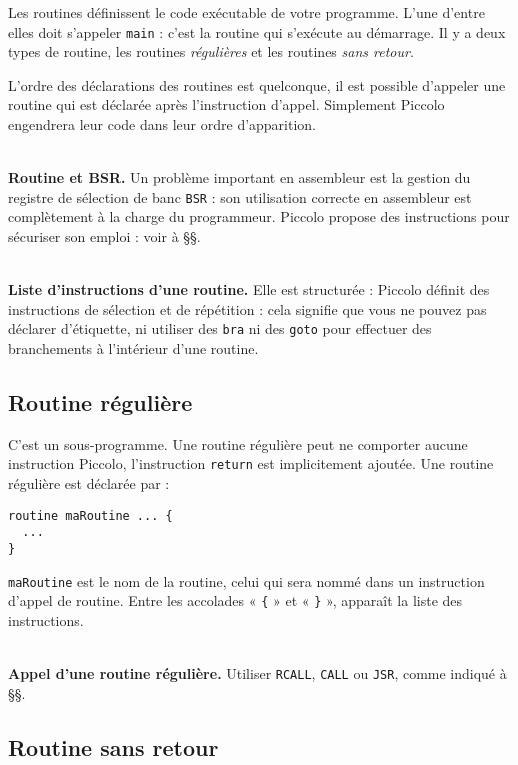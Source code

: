 
Les routines définissent le code exécutable de votre programme. L’une d’entre elles doit s’appeler \texttt{main} : c’est la routine qui s’exécute au démarrage. Il y a deux types de routine, les routines \emph{régulières} et les routines \emph{sans retour}.


L’ordre des déclarations des routines est quelconque, il est possible d’appeler une routine qui est déclarée après l’instruction d’appel. Simplement Piccolo engendrera leur code dans leur ordre d’apparition. 

~\\
\textbf{Routine et BSR.} Un problème important en assembleur est la gestion du registre de sélection de banc \texttt{BSR} : son utilisation correcte en assembleur est complètement à la charge du programmeur. Piccolo propose des instructions pour sécuriser son emploi : voir à §§.

~\\
\textbf{Liste d’instructions d’une routine.} Elle est structurée : Piccolo définit des instructions de sélection et de répétition : cela signifie que vous ne pouvez pas déclarer d’étiquette, ni utiliser des \texttt{bra} ni des \texttt{goto} pour effectuer des branchements à l’intérieur d’une routine.


\subsection{Routine régulière}

C'est un sous-programme. Une routine régulière peut ne comporter aucune instruction Piccolo, l'instruction \texttt{return} est implicitement ajoutée. Une routine régulière est déclarée par :
\begin{lstlisting}[language=piccolo]
routine maRoutine ... {
  ...
}
\end{lstlisting}

\texttt{maRoutine} est le nom de la routine, celui qui sera nommé dans un instruction d’appel de routine. Entre les accolades « \texttt{\{} » et « \texttt{\}} », apparaît la liste des instructions.

~\\
\textbf{Appel d’une routine régulière.} Utiliser \texttt{RCALL}, \texttt{CALL} ou \texttt{JSR}, comme indiqué à §§.

\subsection{Routine sans retour}

